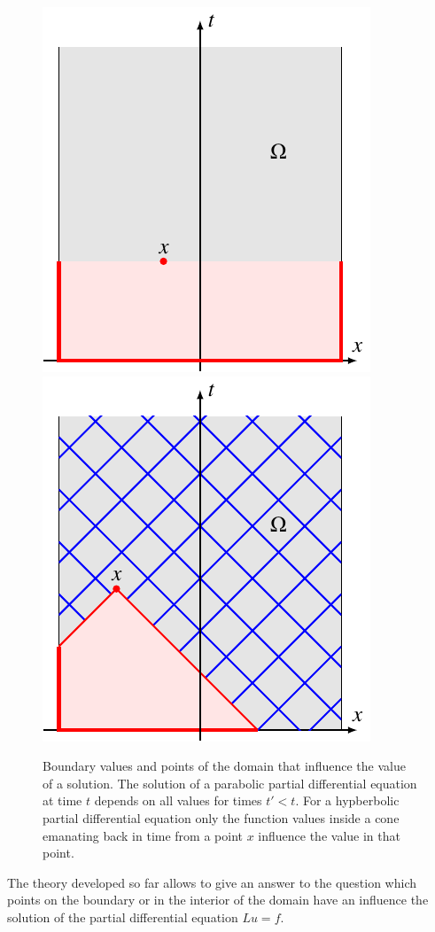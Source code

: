 \begin{figure}
\centering
\includegraphics{9-hyperbolic/images/parabolic.pdf}%
\qquad\qquad%
\includegraphics{9-hyperbolic/images/hyperbolic.pdf}%
\caption{Boundary values and points of the domain that influence
the value of a solution.
The solution of a parabolic partial differential equation
at time $t$ depends on all values for times $t'<t$.
For a hypberbolic partial differential equation only the function
values inside a cone emanating back in time from a point $x$ 
influence the value in that point.
\label{einflussmenge2}}
\end{figure}
The theory developed so far allows to give an answer to the question
which points on the boundary or in the interior of the domain have
an influence the solution of the partial differential equation
$Lu=f$.

